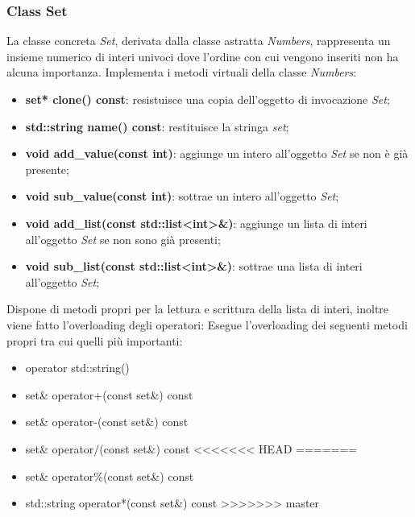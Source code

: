 \documentclass[a4paper,10pt]{article}
\begin{document}
        \subsubsection{Class Set}
        La classe concreta \textit{Set}, derivata dalla classe astratta \textit{Numbers}, rappresenta un insieme numerico di interi univoci dove l’ordine con cui vengono inseriti non ha alcuna importanza. 
        Implementa i metodi virtuali della classe \textit{Numbers}:
        \begin{itemize}
            \item \textbf{set* clone() const}: resistuisce una copia dell'oggetto di invocazione \textit{Set};
            \item \textbf{std::string name() const}: restituisce la stringa \textit{set};
            \item \textbf{void add\_value(const int)}: aggiunge un intero all'oggetto \textit{Set} se non è già presente;
            \item \textbf{void sub\_value(const int)}: sottrae un intero all'oggetto \textit{Set};
            \item \textbf{void add\_list(const std::list<int>\&)}: aggiunge un lista di interi all'oggetto \textit{Set} se non sono già presenti;
            \item \textbf{void sub\_list(const std::list<int>\&)}: sottrae una lista di interi all'oggetto \textit{Set};
        \end{itemize}
        Dispone di metodi propri per la lettura e scrittura della lista di interi, inoltre viene fatto l'overloading  degli operatori:
        Esegue l'overloading dei seguenti metodi propri tra cui  quelli più importanti:
        \begin{itemize}
            \item operator std::string()
            \item set\& operator+(const set\&) const
            \item set\& operator-(const set\&) const
            \item set\& operator/(const set\&) const
    <<<<<<< HEAD
    =======
            \item set\& operator\%(const set\&) const
            \item std::string operator*(const set\&) const
    >>>>>>> master
        \end{itemize}
    
\end{document}
